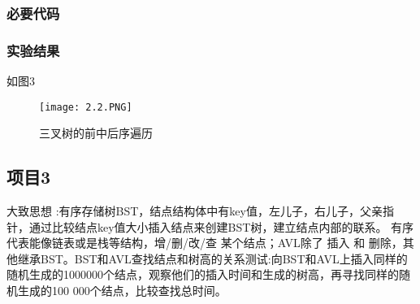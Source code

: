 \subsubsection{必要代码}

\subsubsection{实验结果}如图3
	\begin{figure}[!bthp]
	\centering
       \texttt{[image: 2.2.PNG]}
        \caption{三叉树的前中后序遍历}
      \end{figure}



\subsection{项目3}
大致思想 :有序存储树BST，结点结构体中有key值，左儿子，右儿子，父亲指针，通过比较结点key值大小插入结点来创建BST树，建立结点内部的联系。
有序代表能像链表或是栈等结构，增/删/改/查 某个结点；AVL除了 插入 和 删除，其他继承BST。BST和AVL查找结点和树高的关系测试:向BST和AVL上插入同样的随机生成的1000000个结点，观察他们的插入时间和生成的树高，再寻找同样的随机生成的100 000个结点，比较查找总时间。

